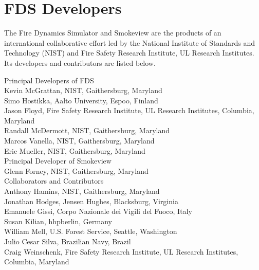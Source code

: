 \chapter{FDS Developers}

The Fire Dynamics Simulator and Smokeview are the products of an international collaborative effort led by
the National Institute of Standards and Technology (NIST) and Fire Safety Research Institute, UL Research Institutes. Its developers and
contributors are listed below.

\vspace{0.3in}

\begin{flushleft}

Principal Developers of FDS  \\ [0.2in]

Kevin McGrattan, NIST, Gaithersburg, Maryland \\
Simo Hostikka, Aalto University, Espoo, Finland \\
Jason Floyd, Fire Safety Research Institute, UL Research Institutes, Columbia, Maryland \\
Randall McDermott, NIST, Gaithersburg, Maryland \\
Marcos Vanella, NIST, Gaithersburg, Maryland \\
Eric Mueller, NIST, Gaithersburg, Maryland \\ [0.3in]

Principal Developer of Smokeview  \\ [0.2in]

Glenn Forney, NIST, Gaithersburg, Maryland \\ [0.3in]

Collaborators and Contributors \\ [0.2in]

Anthony Hamins, NIST, Gaithersburg, Maryland \\
Jonathan Hodges, Jensen Hughes, Blacksburg, Virginia \\
Emanuele Gissi, Corpo Nazionale dei Vigili del Fuoco, Italy \\
Susan Kilian, hhpberlin, Germany \\
William Mell, U.S. Forest Service, Seattle, Washington \\
Julio Cesar Silva, Brazilian Navy, Brazil \\
Craig Weinschenk, Fire Safety Research Institute, UL Research Institutes, Columbia, Maryland

\end{flushleft}

